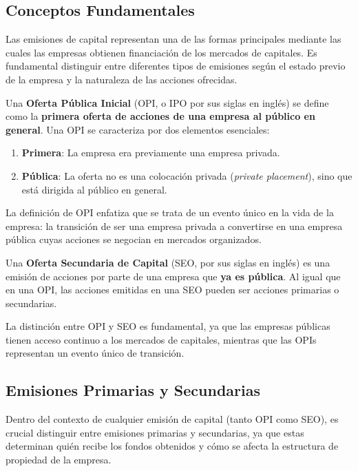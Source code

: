 \subsection{Conceptos Fundamentales}

Las emisiones de capital representan una de las formas principales mediante las cuales las empresas obtienen financiación de los mercados de capitales. Es fundamental distinguir entre diferentes tipos de emisiones según el estado previo de la empresa y la naturaleza de las acciones ofrecidas.

\begin{definicion}
Una \textbf{Oferta Pública Inicial} (OPI, o IPO por sus siglas en inglés) se define como la \textbf{primera oferta de acciones de una empresa al público en general}. Una OPI se caracteriza por dos elementos esenciales:
\begin{enumerate}
\item \textbf{Primera}: La empresa era previamente una empresa privada.
\item \textbf{Pública}: La oferta no es una colocación privada (\textit{private placement}), sino que está dirigida al público en general.
\end{enumerate}
\end{definicion}

La definición de OPI enfatiza que se trata de un evento único en la vida de la empresa: la transición de ser una empresa privada a convertirse en una empresa pública cuyas acciones se negocian en mercados organizados.

\begin{definicion}
Una \textbf{Oferta Secundaria de Capital} (SEO, por sus siglas en inglés) es una emisión de acciones por parte de una empresa que \textbf{ya es pública}. Al igual que en una OPI, las acciones emitidas en una SEO pueden ser acciones primarias o secundarias.
\end{definicion}

La distinción entre OPI y SEO es fundamental, ya que las empresas públicas tienen acceso continuo a los mercados de capitales, mientras que las OPIs representan un evento único de transición.

\subsection{Emisiones Primarias y Secundarias}

Dentro del contexto de cualquier emisión de capital (tanto OPI como SEO), es crucial distinguir entre emisiones primarias y secundarias, ya que estas determinan quién recibe los fondos obtenidos y cómo se afecta la estructura de propiedad de la empresa.

